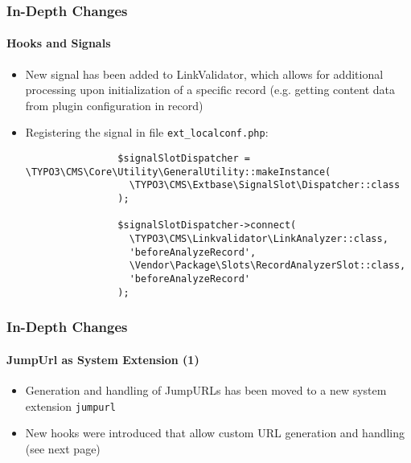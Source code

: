 \begin{frame}[fragile]
	\frametitle{In-Depth Changes}
	\framesubtitle{Hooks and Signals}

	\lstset{basicstyle=\tiny\ttfamily}

	\begin{itemize}

		\item New signal has been added to LinkValidator, which allows for additional
			processing upon initialization of a specific record\newline
			\small
				(e.g. getting content data from plugin configuration in record)
			\normalsize

		\item Registering the signal in file \texttt{ext\_localconf.php}:

			\begin{lstlisting}
				$signalSlotDispatcher = \TYPO3\CMS\Core\Utility\GeneralUtility::makeInstance(
				  \TYPO3\CMS\Extbase\SignalSlot\Dispatcher::class
				);

				$signalSlotDispatcher->connect(
				  \TYPO3\CMS\Linkvalidator\LinkAnalyzer::class,
				  'beforeAnalyzeRecord',
				  \Vendor\Package\Slots\RecordAnalyzerSlot::class,
				  'beforeAnalyzeRecord'
				);
			\end{lstlisting}

	\end{itemize}

\end{frame}


\begin{frame}[fragile]
	\frametitle{In-Depth Changes}
	\framesubtitle{JumpUrl as System Extension (1)}

	\lstset{basicstyle=\tiny\ttfamily}

	\begin{itemize}

		\item Generation and handling of JumpURLs has been moved to a new system extension \texttt{jumpurl}

		\item New hooks were introduced that allow custom URL generation and handling (see next page)

	\end{itemize}

	\breakingchange

\end{frame}


